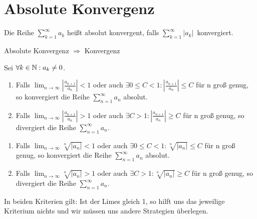 
\section{Absolute Konvergenz}

\begin{definition}
Die Reihe $\sum_{k=1}^{\infty}a_k$ heißt absolut konvergent, falls $\sum_{k=1}^{\infty}|a_k|$\ konvergiert.
\end{definition}
    
\begin{theorem}
 Absolute Konvergenz $\Rightarrow$ Konvergenz
\end{theorem}

\begin{theorem}[Quotientenkriterium]
Sei $\forall k \in \mathbb{N}: a_k\neq 0$.
\begin{enumerate}
\item Falls $\lim_{n\rightarrow \infty}|\frac{a_{n+1}}{a_n}|<1$ oder auch $\exists 0\leq C<1:|\frac{a_{n+1}}{a_n}|\leq C$ für n groß genug, so konvergiert die Reihe $\sum_{n=1}^{\infty}a_n$ absolut.
\item Falls $\lim_{n\rightarrow \infty}|\frac{a_{n+1}}{a_n}|>1$ oder auch $\exists C>1:|\frac{a_{n+1}}{a_n}|\geq C$ für n groß genug, so divergiert die Reihe $\sum_{n=1}^{\infty}a_n$.
\end{enumerate}
\end{theorem}

\begin{theorem}[Wurzelkriterium]
\begin{enumerate}
\item Falls $\lim_{n\rightarrow \infty}\sqrt[n]{|a_n|}<1$ oder auch $\exists 0\leq C<1:\sqrt[n]{|a_n|}\leq C$ für n groß genug, so konvergiert die Reihe $\sum_{n=1}^{\infty}a_n$ absolut.
\item Falls $\lim_{n\rightarrow \infty}\sqrt[n]{|a_n|}>1$ oder auch $\exists C>1:\sqrt[n]{|a_n|}\geq C$ für n groß genug, so divergiert die Reihe $\sum_{n=1}^{\infty}a_n$.
\end{enumerate}
\end{theorem}

\begin{remark}
In beiden Kriterien gilt: Ist der Limes gleich 1, so hilft uns das jeweilige Kriterium nichts und wir müssen uns andere Strategien überlegen.
\end{remark}

